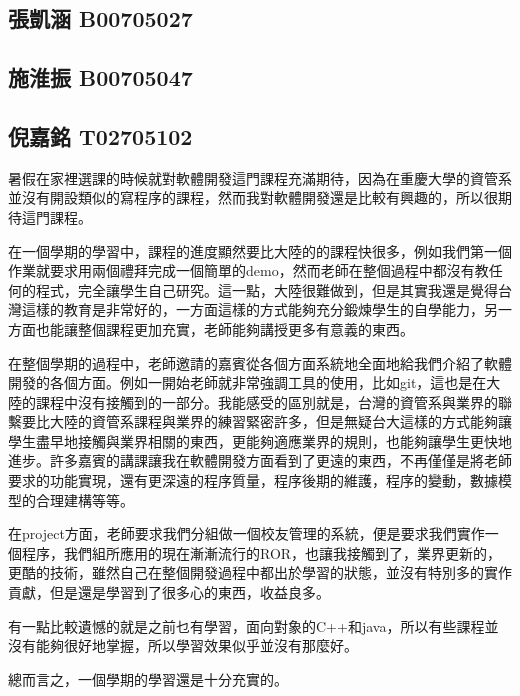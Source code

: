 \subsection{張凱涵 B00705027}

\subsection{施淮振 B00705047}

\subsection{倪嘉銘 T02705102}

暑假在家裡選課的時候就對軟體開發這門課程充滿期待，因為在重慶大學的資管系並沒有開設類似的寫程序的課程，然而我對軟體開發還是比較有興趣的，所以很期待這門課程。

在一個學期的學習中，課程的進度顯然要比大陸的的課程快很多，例如我們第一個作業就要求用兩個禮拜完成一個簡單的demo，然而老師在整個過程中都沒有教任何的程式，完全讓學生自己研究。這一點，大陸很難做到，但是其實我還是覺得台灣這樣的教育是非常好的，一方面這樣的方式能夠充分鍛煉學生的自學能力，另一方面也能讓整個課程更加充實，老師能夠講授更多有意義的東西。

在整個學期的過程中，老師邀請的嘉賓從各個方面系統地全面地給我們介紹了軟體開發的各個方面。例如一開始老師就非常強調工具的使用，比如git，這也是在大陸的課程中沒有接觸到的一部分。我能感受的區別就是，台灣的資管系與業界的聯繫要比大陸的資管系課程與業界的練習緊密許多，但是無疑台大這樣的方式能夠讓學生盡早地接觸與業界相關的東西，更能夠適應業界的規則，也能夠讓學生更快地進步。許多嘉賓的講課讓我在軟體開發方面看到了更遠的東西，不再僅僅是將老師要求的功能實現，還有更深遠的程序質量，程序後期的維護，程序的變動，數據模型的合理建構等等。

在project方面，老師要求我們分組做一個校友管理的系統，便是要求我們實作一個程序，我們組所應用的現在漸漸流行的ROR，也讓我接觸到了，業界更新的，更酷的技術，雖然自己在整個開發過程中都出於學習的狀態，並沒有特別多的實作貢獻，但是還是學習到了很多心的東西，收益良多。

有一點比較遺憾的就是之前乜有學習，面向對象的C++和java，所以有些課程並沒有能夠很好地掌握，所以學習效果似乎並沒有那麼好。

總而言之，一個學期的學習還是十分充實的。

